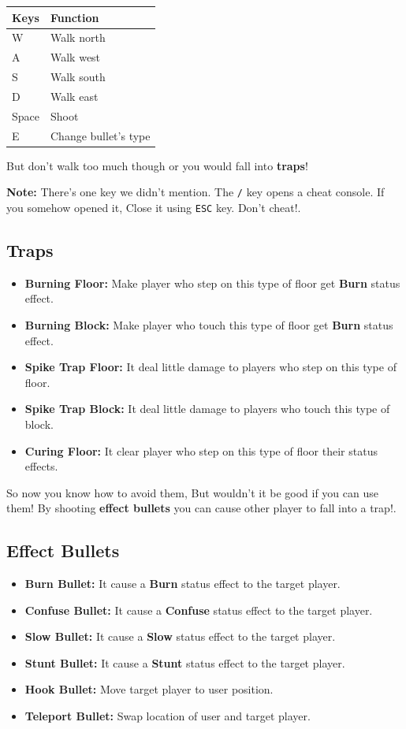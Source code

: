 \documentclass{article}
\begin{document}
\begin{longtable}[]{@{}ll@{}}
\toprule
Keys & Function\tabularnewline
\midrule
\endhead
W & Walk north\tabularnewline
A & Walk west\tabularnewline
S & Walk south\tabularnewline
D & Walk east\tabularnewline
Space & Shoot\tabularnewline
E & Change bullet's type\tabularnewline
\bottomrule
\end{longtable}

But don't walk too much though or you would fall into \textbf{traps}!

\textbf{Note:} There's one key we didn't mention. The \texttt{/} key
opens a cheat console. If you somehow opened it, Close it using
\texttt{ESC} key. Don't cheat!.

\hypertarget{traps}{%
\subsection{Traps}\label{traps}}

\begin{itemize}
\item
  \textbf{Burning Floor:} Make player who step on this type of floor get
  \textbf{Burn} status effect.
\item
  \textbf{Burning Block:} Make player who touch this type of floor get
  \textbf{Burn} status effect.
\item
  \textbf{Spike Trap Floor:} It deal little damage to players who step
  on this type of floor.
\item
  \textbf{Spike Trap Block:} It deal little damage to players who touch
  this type of block.
\item
  \textbf{Curing Floor:} It clear player who step on this type of floor
  their status effects.
\end{itemize}

So now you know how to avoid them, But wouldn't it be good if you can
use them! By shooting \textbf{effect bullets} you can cause other player
to fall into a trap!.

\hypertarget{effect-bullets}{%
\subsection{Effect Bullets}\label{effect-bullets}}

\begin{itemize}
\item
  \textbf{Burn Bullet:} It cause a \textbf{Burn} status effect to the
  target player.
\item
  \textbf{Confuse Bullet:} It cause a \textbf{Confuse} status effect to
  the target player.
\item
  \textbf{Slow Bullet:} It cause a \textbf{Slow} status effect to the
  target player.
\item
  \textbf{Stunt Bullet:} It cause a \textbf{Stunt} status effect to the
  target player.
\item
  \textbf{Hook Bullet:} Move target player to user position.
\item
  \textbf{Teleport Bullet:} Swap location of user and target player.
\end{itemize}
\end{document}
